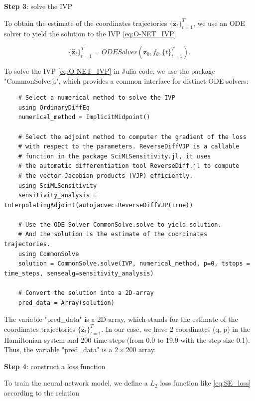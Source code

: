 \documentclass[
	parskip, 			   %
	twoside, 			   %
	DIV=14, 			   %
	BCOR=15.0mm, 		   %
	headsepline, 		   %
	open=right, 		   %
	captions=tableheading, %
	bibliography=totoc,    %
	numbers=noenddot       %
]{scrreprt}
\begin{document}
\textbf{Step 3}: solve the IVP

To obtain the estimate of the coordinates trajectories $\{ \mathbf{\hat{z}}_{t} \}_{t=1}^{T}$, we use an ODE solver to yield the solution to the IVP \ref{eq:O-NET_IVP}

\begin{equation}
    \label{eq:O-NET_ODESolver}
    \{ \mathbf{\hat{z}}_{t} \}_{t=1}^{T} = ODESolver(\mathbf{z}_{0}, f_{\theta}, \{ t \}_{t=1}^{T}).
\end{equation}

To solve the IVP \ref{eq:O-NET_IVP} in Julia code, we use the package "CommonSolve.jl", which provides a common interface for distinct ODE solvers:

\begin{verbatim}
    # Select a numerical method to solve the IVP
    using OrdinaryDiffEq
    numerical_method = ImplicitMidpoint()
    
    # Select the adjoint method to computer the gradient of the loss 
    # with respect to the parameters. ReverseDiffVJP is a callable 
    # function in the package SciMLSensitivity.jl, it uses 
    # the automatic differentiation tool ReverseDiff.jl to compute 
    # the vector-Jacobian products (VJP) efficiently. 
    using SciMLSensitivity
    sensitivity_analysis = InterpolatingAdjoint(autojacvec=ReverseDiffVJP(true))
    
    # Use the ODE Solver CommonSolve.solve to yield solution. 
    # And the solution is the estimate of the coordinates trajectories.
    using CommonSolve
    solution = CommonSolve.solve(IVP, numerical_method, p=θ, tstops = time_steps, sensealg=sensitivity_analysis)
    
    # Convert the solution into a 2D-array
    pred_data = Array(solution)
\end{verbatim}

The variable "pred\_data" is a 2D-array, which stands for the estimate of the coordinates trajectories $\{ \mathbf{\hat{z}}_{t} \}_{t=1}^{T}$. In our case, we have 2 coordinates (q, p) in the Hamiltonian system and 200 time steps (from 0.0 to 19.9 with the step size 0.1). Thus, the variable "pred\_data" is a $2 \times 200$ array.

\textbf{Step 4}: construct a loss function

To train the neural network model, we define a $L_{2}$ loss function like \ref{eq:SE_loss} according to the relation
\end{document}
